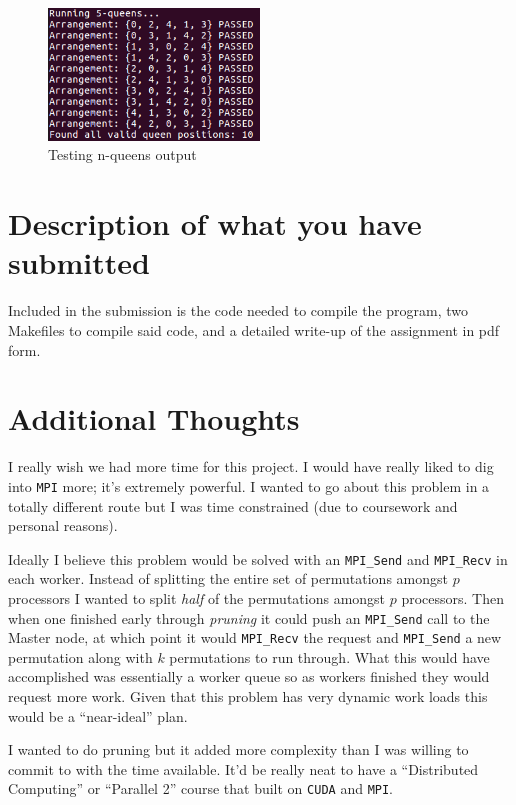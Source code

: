 \documentclass{article}
\begin{document}
\begin{figure}[h]
    \centering
    \includegraphics[width=0.5\textwidth]{images/console_output}
    \caption{Testing n-queens output}
    \label{fig:console}
\end{figure}

\section{Description of what you have submitted}
Included in the submission is the code needed to compile the program, two 
Makefiles to compile said code, and a detailed write-up of the assignment in pdf 
form.

\section{Additional Thoughts}
I really wish we had more time for this project. I would have really liked to 
dig into \verb|MPI| more; it's extremely powerful. I wanted to go about this 
problem in a totally different route but I was time constrained (due to 
coursework and personal reasons). 

Ideally I believe this problem would be solved with an \verb|MPI_Send| and 
\verb|MPI_Recv| in each worker. Instead of splitting the entire set of 
permutations amongst $p$ processors I wanted to split \textit{half} of the 
permutations amongst $p$ processors. Then when one finished early through 
\textit{pruning} it could push an \verb|MPI_Send| call to the Master node, at 
which point it would \verb|MPI_Recv| the request and \verb|MPI_Send| a new 
permutation along with $k$ permutations to run through. What this would have 
accomplished was essentially a worker queue so as workers finished they would 
request more work. Given that this problem has very dynamic work loads this 
would be a ``near-ideal'' plan.

I wanted to do pruning but it added more complexity than I was willing to commit 
to with the time available. It'd be really neat to have a 
``Distributed Computing'' or ``Parallel 2'' course that built on \verb|CUDA| and 
\verb|MPI|.
\end{document}
